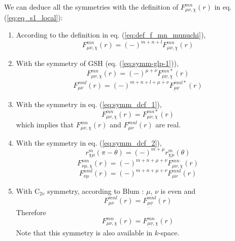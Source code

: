 We can deduce all the symmetries with the definition of $F_{\mu\nu,\chi}^{mn}(r)$
in eq. (\ref{eq:eq_s1_local}):
\begin{enumerate}
\item According to the definition in eq. (\ref{eq:def_f_mn_munuchi}),
\begin{equation}
F_{\mu\nu,\chi}^{mn}(r)=\left(-\right)^{m+n+l}F_{\mu\nu,\underline{\chi}}^{mn}(r)\label{eq:-chi_symm}
\end{equation}
\item With the symmetry of \acs{GSH} (eq. (\ref{eq:symm-glp-1})),
\begin{equation}
F_{\mu\nu,\chi}^{mn}(r)=\left(-\right)^{\mu+\nu}F_{\underline{\mu}\underline{\nu},\underline{\chi}}^{mn*}(r)
\end{equation}
\begin{equation}
F_{\mu\nu}^{mnl}(r)=\left(-\right)^{m+n+l+\mu+\nu}F_{\underline{\mu}\underline{\nu}}^{mnl*}(r)\label{eq:sym301}
\end{equation}
\item With the symmetry in eq. (\ref{eq:symm_dcf_1}),
\begin{equation}
F_{\mu\nu,\chi}^{mn}(r)=F_{\mu\nu,\chi}^{mn*}(r)
\end{equation}
which implies that $F_{\mu\nu,\chi}^{mn}(r)$ and $F_{\mu\nu}^{mnl}(r)$
are real.
\item With the symmetry in eq. (\ref{eq:symm_dcf_2}),
\begin{equation}
r_{\chi\mu}^{m}(\pi-\theta)=\left(-\right)^{m+\mu}r_{\underline{\chi}\mu}^{m}(\theta)
\end{equation}
\begin{equation}
F_{\nu\mu,\chi}^{nm}(r)=\left(-\right)^{m+n+\mu+\nu}F_{\mu\nu,\chi}^{mn}(r)
\end{equation}
\begin{equation}
F_{\nu\mu}^{nml}(r)=\left(-\right)^{m+n+\mu+\nu}F_{\mu\nu}^{mnl}(r)
\end{equation}
\item With $\mathrm{C}_{2v}$ symmetry, according to Blum \citep{Blum_I}:
$\mu$, $\nu$ is even and
\begin{equation}
F_{\mu\nu}^{mnl}(r)=F_{\underline{\mu}\underline{\nu}}^{mnl}(r)
\end{equation}
Therefore
\begin{equation}
F_{\mu\nu,\chi}^{mn}(r)=F_{\underline{\mu}\underline{\nu},\chi}^{mn}(r)
\end{equation}
Note that this symmetry is also available in $k$-space.

\end{enumerate}
